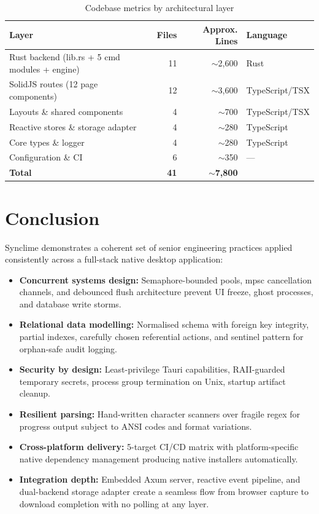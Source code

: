 \documentclass[10pt,letterpaper]{article}
\begin{document}
\begin{table}[H]
\centering\small
\renewcommand{\arraystretch}{1.3}
\begin{tabular}{lrrl}
\toprule
\textbf{Layer} & \textbf{Files} & \textbf{Approx. Lines} & \textbf{Language} \\
\midrule
Rust backend (lib.rs + 5 cmd modules + engine) & 11 & $\sim$2,600 & Rust \\
SolidJS routes (12 page components) & 12 & $\sim$3,600 & TypeScript/TSX \\
Layouts \& shared components & 4 & $\sim$700 & TypeScript/TSX \\
Reactive stores \& storage adapter & 4 & $\sim$280 & TypeScript \\
Core types \& logger & 4 & $\sim$280 & TypeScript \\
Configuration \& CI & 6 & $\sim$350 & --- \\
\midrule
\textbf{Total} & \textbf{41} & \textbf{$\sim$7,800} & \\
\bottomrule
\end{tabular}
\caption{Codebase metrics by architectural layer}
\end{table}

\section{Conclusion}

Synclime demonstrates a coherent set of senior engineering practices applied consistently
across a full-stack native desktop application:

\begin{itemize}[leftmargin=1.6em, itemsep=4pt]
  \item \textbf{Concurrent systems design:} Semaphore-bounded pools, mpsc cancellation
        channels, and debounced flush architecture prevent UI freeze, ghost processes,
        and database write storms.
  \item \textbf{Relational data modelling:} Normalised schema with foreign key integrity,
        partial indexes, carefully chosen referential actions, and sentinel pattern for
        orphan-safe audit logging.
  \item \textbf{Security by design:} Least-privilege Tauri capabilities, RAII-guarded
        temporary secrets, process group termination on Unix, startup artifact cleanup.
  \item \textbf{Resilient parsing:} Hand-written character scanners over fragile regex
        for progress output subject to ANSI codes and format variations.
  \item \textbf{Cross-platform delivery:} 5-target CI/CD matrix with platform-specific
        native dependency management producing native installers automatically.
  \item \textbf{Integration depth:} Embedded Axum server, reactive event pipeline, and
        dual-backend storage adapter create a seamless flow from browser capture to
        download completion with no polling at any layer.
\end{itemize}
\end{document}
